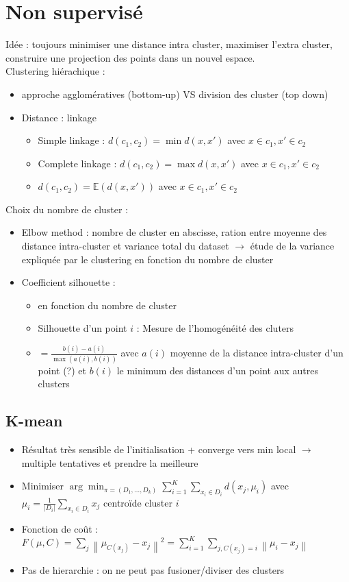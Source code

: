 \documentclass{article}
\begin{document}
\section{Non supervisé}
Idée : toujours minimiser une distance intra cluster, maximiser l'extra cluster, construire une projection des points dans un nouvel espace. \\
Clustering hiérachique : 
\begin{itemize}
    \item approche agglomératives (bottom-up) VS division des cluster (top down)
    \item Distance : linkage \begin{itemize}
        \item Simple linkage : $ d(c_1, c_2) = \min d(x, x') $ avec $ x \in c_1, x' \in c_2 $ 
        \item Complete linkage : $ d(c_1, c_2) = \max d(x, x') $ avec $ x \in c_1, x' \in c_2 $ 
        \item $ d(c_1, c_2) = \mathbb{E}(d(x, x')) $ avec $ x \in c_1, x' \in c_2 $ 
    \end{itemize}
\end{itemize}
Choix du nombre de cluster : 
\begin{itemize}
    \item Elbow method : nombre de cluster en abscisse, ration entre moyenne des distance intra-cluster et variance total du dataset $\rightarrow$ étude de la variance expliquée par le clustering en fonction du nombre de cluster 
    \item Coefficient silhouette : \begin{itemize}
        \item en fonction du nombre de cluster
        \item Silhouette d'un point $ i $ : Mesure de l'homogénéité des cluters
        \item $ = \frac{b(i) - a(i)}{ \max (a(i), b(i))} $ avec $ a(i) $ moyenne de la distance intra-cluster d'un point (?) et $ b(i) $ le minimum des distances d'un point aux autres clusters
    \end{itemize}
\end{itemize}

\subsection{K-mean}
\begin{itemize}
    \item Résultat très sensible de l'initialisation + converge vers min local $\rightarrow$ multiple tentatives et prendre la meilleure
    \item Minimiser $ \arg \min _{\pi = (D_1, \dots, D_k)} \sum_{i=1}^{K} \sum_{x_i \in D_i}^{} d(x_j, \mu _i)$ avec $ \mu _i = \frac{1}{\left| D_i \right| } \sum_{x_i \in D_i} x_j$ centroïde cluster $ i $ 
    \item Fonction de coût : $ F(\mu , C) = \sum_{j}^{} \left\| \mu _{C(x_j)} - x_j \right\|^2 = \sum_{i=1}^{K} \sum_{j, C(x_j) = i} \left\| \mu _i - x_j \right\| $ 
    \item Pas de hierarchie : on ne peut pas fusioner/diviser des clusters
\end{itemize}
\end{document}
